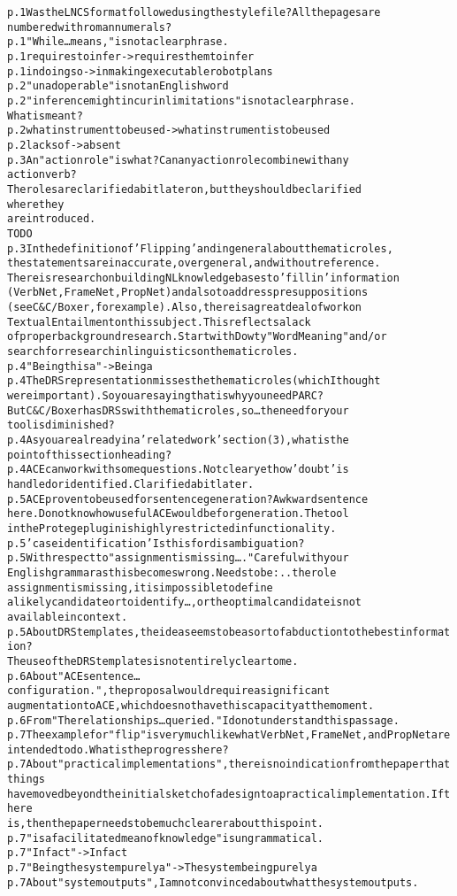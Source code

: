 \documentclass[oribibl]{llncs}
\newcommand{\comment}[1]{{\color{red} #1}}
\newcommand{\tick}{{\color{red}\ding{52}}}
\begin{document}
\begin{alltt}
p. 1 Was the LNCS format followed using the style file?  All the pages are 
numbered with roman numerals?
p. 1 "While…means," is not a clear phrase.
p. 1 requires to infer -> requires them to infer \tick
p. 1 in doing so -> in making executable robot plans
p. 2 "unadoperable" is not an English word \tick
p. 2  "inference might incur in limitations" is not a clear phrase. 
 What is meant?
p. 2  what instrument to be used -> what instrument is to be used \tick
p. 2 lacks of -> absent \tick
p. 3 An "action role" is what?  Can any action role combine with any 
action verb?  
The roles are clarified a bit later on, but they should be clarified 
where they 
are introduced.
\comment{TODO}
p. 3 In the definition of 'Flipping' and in general about thematic roles,
 the statements are inaccurate, overgeneral, and without reference.  
 There is research on building NL knowledge bases to 'fill in' information
  (VerbNet, FrameNet, PropNet) and also to address presuppositions 
  (see C&C/Boxer, for example).  Also, there is a great deal of work on 
  Textual Entailment on this subject.  This reflects a lack 
 of proper background research.  Start with Dowty "Word Meaning" and/or 
 search for research in linguistics on thematic roles.
p. 4 "Being this a" -> Being a \tick
p. 4 The DRS representation misses the thematic roles (which I thought 
were important). So you are saying that is why you need PARC?  
But C&C/Boxer has DRSs with thematic roles, so…the need for your 
tool is diminished?
p. 4 As you are already in a 'related work' section (3), what is the 
point of this section heading?
p. 4 ACE can work with some questions.  Not clear yet how 'doubt' is
 handled or identified. Clarified a bit later. 
p. 5 ACE proven to be used for sentence generation?  Awkward sentence
 here.  Do not know how useful ACE would be for generation.  The tool 
 in the Protege plug in is highly restricted in functionality.
p. 5 'case identification' Is this for disambiguation?
p. 5 With respect to "assignment is missing…."  Careful with your
 English grammar as this becomes wrong.  Needs to be: ..the role 
 assignment is missing, it is impossible to define 
a likely candidate or to identify…, or the optimal candidate is not
 available in context.
p. 5 About DRS templates, the idea seems to be a sort of abduction to the best information?
  The use of the DRS templates is not entirely clear to me.
p. 6 About "ACE sentence…configuration.", the proposal would require a significant 
augmentation to ACE, which does not have this capacity at the moment.
p. 6 From "The relationships…queried."  I do not understand this passage.
p. 7 The example for "flip" is very much like what VerbNet, FrameNet, and PropNet are 
intended to do.  What is the progress here?
p. 7 About "practical implementations", there is no indication from the paper that things 
have moved beyond the initial sketch of a design to a practical implementation.  If there 
is, then the paper needs to be much clearer about this point.
p. 7 "is a facilitated mean of knowledge" is ungrammatical. \tick
p. 7 "Infact" -> In fact \tick
p. 7 "Being the system purely a" -> The system being purely a \tick
p. 7 About "system outputs", I am not convinced about what the system outputs. \tick



\end{alltt}
\end{document}
